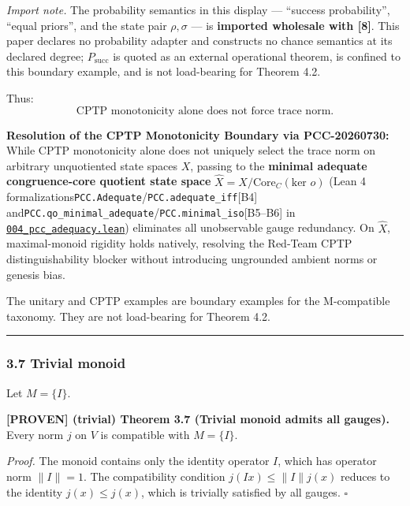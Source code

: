 \documentclass[
  11pt,
]{article}
\renewenvironment{quote}
  {\begin{leftbar}\small}
  {\end{leftbar}}
\begin{document}
\emph{Import note.} The probability semantics in this display --- ``success probability'', ``equal priors'', and the
state pair \(\rho,\sigma\) --- is \textbf{imported wholesale with {[}8{]}}. This paper declares no probability adapter and
constructs no chance semantics at its declared degree; \(P_{\mathrm{succ}}\) is quoted as an external
operational theorem, is confined to this boundary example, and is not load-bearing for Theorem 4.2.

Thus:
\[
\boxed{
\text{CPTP monotonicity alone does not force trace norm.}
}
\]

\begin{quote}
\textbf{Resolution of the CPTP Monotonicity Boundary via PCC-20260730:}\\
While CPTP monotonicity alone does not uniquely select the trace norm on arbitrary unquotiented state spaces \(X\), passing to the \textbf{minimal adequate congruence-core quotient state space} \(\widehat{X} = X / \text{Core}_C(\text{ker } o)\) (Lean 4 formalizations\texttt{PCC.Adequate}/\texttt{PCC.adequate\_iff}{[}B4{]} and\texttt{PCC.qo\_minimal\_adequate}/\texttt{PCC.minimal\_iso}{[}B5--B6{]} in \href{\%60Lean\%20package\%20path\%20(see\%20claim\%20ledger\%20/\%20lake\%20target;\%20monorepo\%20path\%20omitted\%20for\%20release)\%60}{\texttt{004\_pcc\_adequacy.lean}}) eliminates all unobservable gauge redundancy. On \(\widehat{X}\), maximal-monoid rigidity holds natively, resolving the Red-Team CPTP distinguishability blocker without introducing ungrounded ambient norms or genesis bias.

The unitary and CPTP examples are boundary examples for the M-compatible taxonomy. They are not load-bearing for Theorem 4.2.

\begin{center}\rule{0.5\linewidth}{0.5pt}\end{center}
\end{quote}

\subsubsection{3.7 Trivial monoid}\label{trivial-monoid}

Let \(M = \{I\}\).

\textbf{{[}PROVEN{]} (trivial) Theorem 3.7 (Trivial monoid admits all gauges).} Every norm \(j\) on \(V\) is compatible with \(M = \{I\}\).

\emph{Proof.} The monoid contains only the identity operator \(I\), which has operator norm \(\|I\| = 1\). The compatibility condition \(j(I x) \leq \|I\| j(x)\) reduces to the identity \(j(x) \leq j(x)\), which is trivially satisfied by all gauges. \(\square\)
\end{document}
